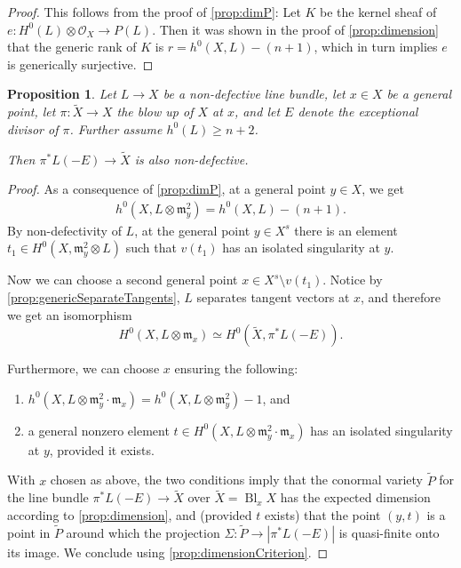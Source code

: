 \documentclass[11pt,reqno]{amsart}
\theoremstyle{plain}
\newtheorem{proposition}[theorem]{Proposition}
\theoremstyle{definition}
\theoremstyle{remark}
\numberwithin{equation}{section}
\DeclareMathOperator{\Bl}{Bl}
\newcommand{\cO}{{\mathcal O}}
\renewcommand{\to}{{\longrightarrow}}
\numberwithin{equation}{section}
\begin{document}
\begin{proof}

This follows from the proof of \autoref{prop:dimP}: Let $K$ be the kernel sheaf of $e: H^{0}(L) \otimes \cO_{X} \to P(L)$. Then it was shown in the proof of \autoref{prop:dimension} that the generic rank of $K$ is $r = h^{0}(X,L) - (n+1) $, which in turn implies  $e$ is generically surjective.   
\end{proof}



\begin{proposition}
  \label{prop:blowuppoint}
  Let $L \to X$ be a non-defective line bundle, let $x \in X$ be a general point, let $\pi : \widetilde{X} \to X$ the blow up of $X$ at $x$, and let $E$ denote the exceptional divisor of $\pi$. Further assume $h^{0}(L) \geq n+2$. 

  Then $\pi^{*}L (-E) \to \widetilde{X}$ is also non-defective. 
\end{proposition}

\begin{proof}
 As a consequence of \autoref{prop:dimP}, at a general point $y \in X$, we get
  \begin{align*}
    h^{0}(X,  L \otimes {\mathfrak{m}^{2}_{y}}) = h^{0}(X,L) - (n+1).
  \end{align*}
By non-defectivity of $L$, at the general point $y \in X^{s}$ there is an element $t_{1} \in H^{0}(X, {\mathfrak{m}^{2}_{y}} \otimes L)$ such that $v(t_{1})$ has an isolated singularity at $y$.

Now we can choose a second general point $x \in X^{s} \setminus v(t_{1})$. 
Notice  by \autoref{prop:genericSeparateTangents}, $L$ separates
tangent vectors at  $x$, and therefore we get an isomorphism
$$H^{0}(X, L \otimes {\mathfrak m}_{x}) \simeq H^{0}(\widetilde{X},
\pi^{*}L(-E)).$$
 

Furthermore, we can choose $x$ ensuring the following: 
\begin{enumerate}
  \item  $h^{0}(X,  L \otimes {\mathfrak m}^{2}_{y}\cdot {\mathfrak m}_{x}) = h^{0}(X,  L \otimes {\mathfrak{m}^{2}_{y}}) - 1$, and
  \item a general nonzero element $t \in  H^{0}(X, L \otimes{\mathfrak m}^{2}_{y}\cdot {\mathfrak m}_{x})$ has an isolated singularity at $y$, provided it exists.
 \end{enumerate}

 With $x$ chosen as above, the two conditions imply that the conormal variety
 $\widetilde{P}$ for the line bundle $\pi^{*}L(-E) \to {\widetilde{X}}$ over
 $\widetilde{X} = \Bl_{x}X$ has the expected dimension according to \autoref{prop:dimension}, and (provided $t$ exists) that the point $(y,t)$ is a point in $\widetilde{P}$ around which the projection $\Sigma: \widetilde{P} \to |\pi^{*}L(-E)|$ is quasi-finite onto its image. We conclude using \autoref{prop:dimensionCriterion}.
\end{proof}
\end{document}
